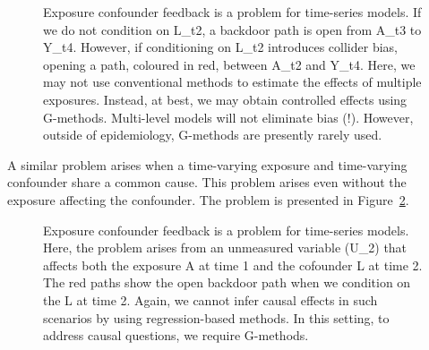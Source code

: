 \documentclass[
  singlecolumn,
  9pt]{article}
\begin{document}
\begin{figure}


\caption{\label{fig-dag-9}Exposure confounder feedback is a problem for
time-series models. If we do not condition on L\_t2, a backdoor path is
open from A\_t3 to Y\_t4. However, if conditioning on L\_t2 introduces
collider bias, opening a path, coloured in red, between A\_t2 and Y\_t4.
Here, we may not use conventional methods to estimate the effects of
multiple exposures. Instead, at best, we may obtain controlled effects
using G-methods. Multi-level models will not eliminate bias (!).
However, outside of epidemiology, G-methods are presently rarely used.}

\end{figure}%

A similar problem arises when a time-varying exposure and time-varying
confounder share a common cause. This problem arises even without the
exposure affecting the confounder. The problem is presented in
Figure~\ref{fig-dag-time-vary-common-cause-A1-l1}.

\begin{figure}


\caption{\label{fig-dag-time-vary-common-cause-A1-l1}Exposure confounder
feedback is a problem for time-series models. Here, the problem arises
from an unmeasured variable (U\_2) that affects both the exposure A at
time 1 and the cofounder L at time 2. The red paths show the open
backdoor path when we condition on the L at time 2. Again, we cannot
infer causal effects in such scenarios by using regression-based
methods. In this setting, to address causal questions, we require
G-methods.}

\end{figure}%
\end{document}
